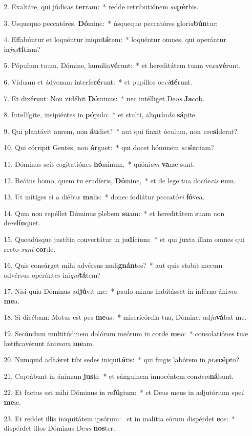 2. Exaltáre, qui júdicas \textbf{ter}ram:~*  redde retributiónem \textit{su}\textbf{pér}bis.\

3. Usquequo peccatóres, \textbf{Dó}mine:~*  úsquequo peccatóres glori\textit{a}\textbf{bún}tur:\

4. Effabúntur et loquéntur iniqui\textbf{tá}tem:~*  loquéntur omnes, qui operántur in\textit{jus}\textbf{tí}tiam?\

5. Pópulum tuum, Dómine, humilia\textbf{vé}runt:~*  et hereditátem tuam ve\textit{xa}\textbf{vé}runt.\

6. Víduam et ádvenam interfe\textbf{cé}runt:~*  et pupíllos oc\textit{ci}\textbf{dé}runt.\

7. Et dixérunt: Non vidébit \textbf{Dó}minus:~*  nec intélliget De\textit{us} \textbf{Ja}cob.\

8. Intellígite, insipiéntes in \textbf{pó}pulo:~*  et stulti, aliquán\textit{do} \textbf{sá}pite.\

9. Qui plantávit aurem, non \textbf{áu}diet?~*  aut qui finxit óculum, non \textit{con}\textbf{sí}derat?\

10. Qui córripit Gentes, non \textbf{ár}guet:~*  qui docet hóminem \textit{sci}\textbf{én}tiam?\

11. Dóminus scit cogitatiónes \textbf{hó}minum,~*  quóni\textit{am} \textbf{va}næ sunt.\

12. Beátus homo, quem tu erudíeris, \textbf{Dó}mine,~*  et de lege tua docúe\textit{ris} \textbf{e}um.\

13. Ut mítiges ei a diébus \textbf{ma}lis:~*  donec fodiátur peccató\textit{ri} \textbf{fó}vea.\

14. Quia non repéllet Dóminus plebem \textbf{su}am:~*  et hereditátem suam non de\textit{re}\textbf{lín}quet.\

15. Quoadúsque justítia convertátur in ju\textbf{dí}cium:~*  et qui juxta illam omnes qui recto \textit{sunt} \textbf{cor}de.\

16. Quis consúrget mihi advérsus mali\textbf{gnán}tes?~*  aut quis stabit mecum advérsus operántes ini\textit{qui}\textbf{tá}tem?\

17. Nisi quia Dóminus ad\textbf{jú}vit me:~*  paulo minus habitásset in inférno áni\textit{ma} \textbf{me}a.\

18. Si dicébam: Motus est pes \textbf{me}us:~*  misericórdia tua, Dómine, ad\textit{ju}\textbf{vá}bat me.\

19. Secúndum multitúdinem dolórum meórum in corde \textbf{me}o:~*  consolatiónes tuæ lætificavérunt áni\textit{mam} \textbf{me}am.\

20. Numquid adhǽret tibi sedes iniqui\textbf{tá}tis:~*  qui fingis labórem in \textit{præ}\textbf{cép}to?\

21. Captábunt in ánimam \textbf{jus}ti:~*  et sánguinem innocéntem con\textit{dem}\textbf{ná}bunt.\

22. Et factus est mihi Dóminus in re\textbf{fú}gium:~*  et Deus meus in adjutórium spe\textit{i} \textbf{me}æ.\

23. Et reddet illis iniquitátem ipsórum: \dag\  et in malítia eórum dispérdet \textbf{e}os:~*  dispérdet illos Dóminus De\textit{us} \textbf{nos}ter.\


